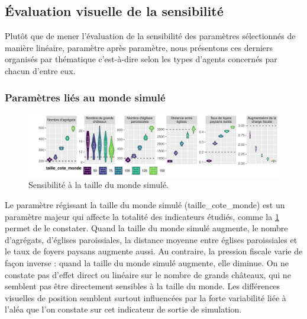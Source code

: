 \subsection{Évaluation visuelle de la sensibilité}


Plutôt que de mener l'évaluation de la sensibilité des paramètres sélectionnés de manière linéaire, paramètre après paramètre, nous présentons ces derniers organisés par thématique c'est-à-dire selon les types d'agents concernés par chacun d'entre eux.

\subsubsection{Paramètres liés au monde simulé}

\begin{figure}[H]
	\centering
	\includegraphics[width=\linewidth]{img/sensib/sensibilite_taille_cote_monde.pdf}
	\caption{Sensibilité à la taille du monde simulé.}
	\label{fig:sensib-monde}
\end{figure}


Le paramètre régissant la taille du monde simulé (\textsf{taille\_cote\_monde}) est un paramètre majeur qui affecte la totalité des indicateurs étudiés, comme la \cref{fig:sensib-monde} permet de le constater.
Quand la taille du monde simulé augmente, le nombre d'agrégats, d'églises paroissiales, la distance moyenne entre églises paroissiales et le taux de foyers paysans augmente aussi.
Au contraire, la pression fiscale varie de façon inverse : quand la taille du monde simulé augmente, elle diminue.
On ne constate pas d'effet direct ou linéaire sur le nombre de grands châteaux, qui ne semblent pas être directement sensibles à la taille du monde.
Les différences visuelles de position semblent surtout influencées par la forte variabilité liée à l'aléa que l'on constate sur cet indicateur de sortie de simulation.

